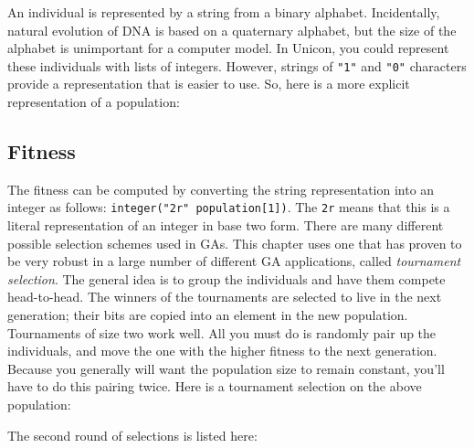 An individual is represented by a string from a binary alphabet.
Incidentally, natural evolution of DNA is based on a quaternary
alphabet, but the size of the alphabet is unimportant for a computer
model. In Unicon, you could represent these individuals with lists of
integers. However, strings of \texttt{"1"}
and \texttt{"0"} characters provide a
representation that is easier to use. So, here is a more explicit
representation of a population:


\subsection*{Fitness}

The fitness can be computed by converting the string representation into
an integer as follows: \texttt{integer("2r"
{\textbar}{\textbar} population[1])}. The \texttt{2r} means that this
is a literal representation of an integer in base two form. There are
many different possible selection schemes used in GAs. This chapter
uses one that has proven to be very robust in a large number of
different GA applications, called \textit{tournament selection}. The
general idea is to group the individuals and have them compete
head-to-head. The winners of the tournaments are selected to live in
the next generation; their bits are copied into an element in the new
population. Tournaments of size two work well. All you must do is
randomly pair up the individuals, and move the one with the higher
fitness to the next generation. Because you generally will want the
population size to remain constant, you'll have to do
this pairing twice. Here is a tournament selection on the above
population:


The second round of selections is listed here:


